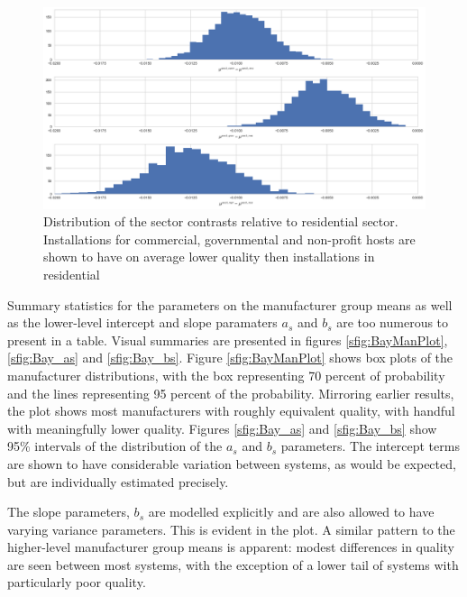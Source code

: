 \documentclass[12pt]{article}
\begin{document}
\begin{figure}
  \includegraphics[width=1\linewidth]{figures/mu_sectors.png}
  \caption{Distribution of the sector contrasts relative to residential sector. Installations for commercial, governmental and non-profit hosts are shown to have on average lower quality then installations in residential}
  \label{mu_sectors}
\end{figure}

Summary statistics for the parameters on the manufacturer group means as well as the lower-level intercept and slope paramaters $a_s$ and $b_s$ are too numerous to present in a table. Visual summaries are presented in figures \ref{sfig:BayManPlot}, \ref{sfig:Bay_as} and \ref{sfig:Bay_bs}. Figure \ref{sfig:BayManPlot} shows box plots of the manufacturer distributions, with the box representing 70 percent of probability and the lines representing 95 percent of the probability. Mirroring earlier results, the plot shows most manufacturers with roughly equivalent quality, with handful with meaningfully lower quality. Figures \ref{sfig:Bay_as} and \ref{sfig:Bay_bs} show 95\% intervals of the distribution of the $a_s$ and $b_s$ parameters. The intercept terms are shown to have considerable variation between systems, as would be expected, but are individually estimated precisely.

The slope parameters, $b_s$ are modelled explicitly and are also allowed to have varying variance parameters. This is evident in the plot. A similar pattern to the higher-level manufacturer group means is apparent: modest differences in quality are seen between most systems, with the exception of a lower tail of systems with particularly poor quality.
\end{document}
